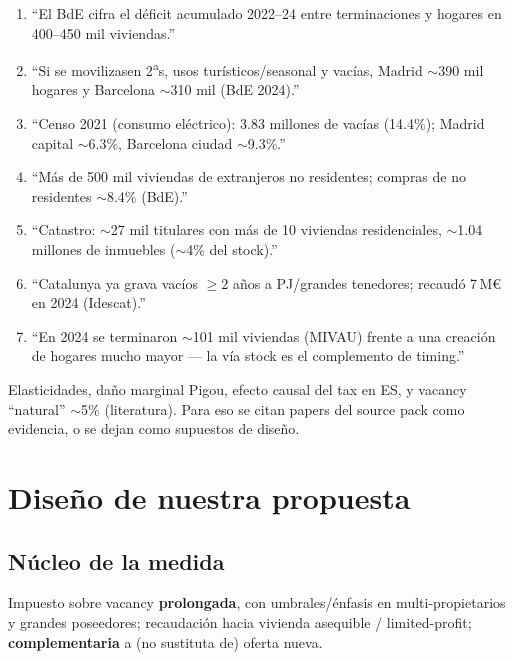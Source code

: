 \documentclass[11pt,a4paper]{report}
\begin{document}
\begin{enumerate}
  \item ``El BdE cifra el d\'eficit acumulado 2022--24 entre terminaciones y hogares
        en 400--450 mil viviendas.''
  \item ``Si se movilizasen 2\textsuperscript{a}s, usos tur\'isticos/seasonal y vac\'ias,
        Madrid $\sim$390 mil hogares y Barcelona $\sim$310 mil (BdE 2024).''
  \item ``Censo 2021 (consumo el\'ectrico): 3.83 millones de vac\'ias (14.4\%);
        Madrid capital $\sim$6.3\%, Barcelona ciudad $\sim$9.3\%.''
  \item ``M\'as de 500 mil viviendas de extranjeros no residentes; compras de no residentes
        $\sim$8.4\% (BdE).''
  \item ``Catastro: $\sim$27 mil titulares con m\'as de 10 viviendas residenciales,
        $\sim$1.04 millones de inmuebles ($\sim$4\% del stock).''
  \item ``Catalunya ya grava vac\'ios $\ge 2$ a\~nos a PJ/grandes tenedores;
        recaud\'o 7\,M€ en 2024 (Idescat).''
  \item ``En 2024 se terminaron $\sim$101 mil viviendas (MIVAU) frente a una creaci\'on
        de hogares mucho mayor --- la v\'ia stock es el complemento de timing.''
\end{enumerate}

\begin{cuidado}[title={Lo que NO hay como dato oficial}]
Elasticidades, da\~no marginal Pigou, efecto causal del tax en ES, y vacancy
``natural'' $\sim$5\% (literatura). Para eso se citan papers del source pack
como evidencia, o se dejan como supuestos de dise\~no.
\end{cuidado}

\chapter{Dise\~no de nuestra propuesta}
\label{ch:diseno}

\section{N\'ucleo de la medida}

\begin{frase}
Impuesto sobre vacancy \textbf{prolongada}, con umbrales/\'enfasis en
multi-propietarios y grandes poseedores; recaudaci\'on hacia vivienda
asequible / limited-profit; \textbf{complementaria} a (no sustituta de) oferta nueva.
\end{frase}
\end{document}
